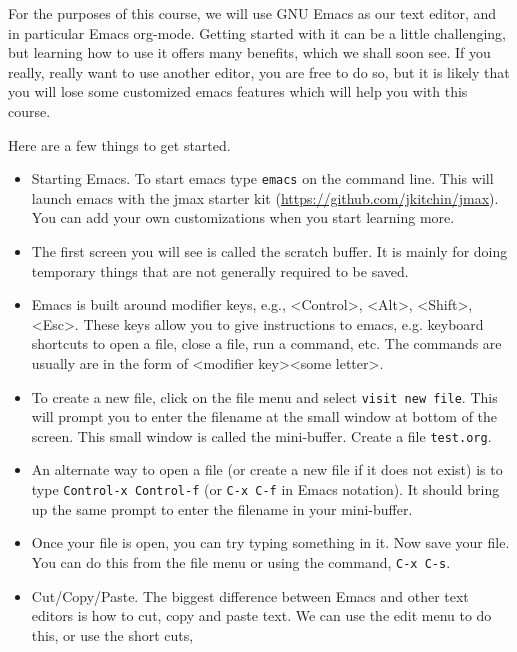 \documentclass[11pt]{article}
\begin{document}
For the purposes of this course, we will use GNU Emacs as our text editor, and in particular Emacs org-mode. Getting started with it can be a little challenging, but learning how to use it offers many benefits, which we shall soon see. If you really, really want to use another editor, you are free to do so, but it is likely that you will lose some customized emacs features which will help you with this course.

Here are a few things to get started.

\begin{itemize}
\item Starting Emacs. To start emacs type \verb~emacs~ on the command line. This will launch emacs with the jmax starter kit (\url{https://github.com/jkitchin/jmax}). You can add your own customizations when you start learning more.

\item The first screen you will see is called the scratch buffer. It is mainly for doing temporary things that are not generally required to be saved.

\item Emacs is built around modifier keys, e.g., <Control>, <Alt>, <Shift>, <Esc>. These keys allow you to give instructions to emacs, e.g. keyboard shortcuts to open a file, close a file, run a command, etc. The commands are usually are in the form of <modifier key><some letter>.

\item To create a new file, click on the file menu and select \texttt{visit new file}. This will prompt you to enter the filename at the small window at bottom of the screen. This small window is called the mini-buffer. Create a file \texttt{test.org}.

\item An alternate way to open a file (or create a new file if it does not exist) is to type \verb~Control-x Control-f~ (or \verb~C-x C-f~ in Emacs notation). It should bring up the same prompt to enter the filename in your mini-buffer.

\item Once your file is open, you can try typing something in it. Now save your file. You can do this from the file menu or using the command, \verb~C-x C-s~.

\item Cut/Copy/Paste. The biggest difference between Emacs and other text editors is how to cut, copy and paste text. We can use the edit menu to do this, or use the short cuts,


\end{itemize}
\end{document}
